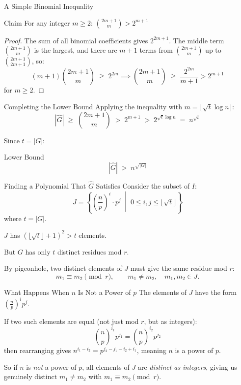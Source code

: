 \documentclass{beamer}
\begin{document}

\begin{frame}{A Simple Binomial Inequality}
\begin{block}{Claim}
For any integer $m \ge 2$: $\displaystyle\binom{2m+1}{m} > 2^{m+1}$
\end{block}

\begin{proof}
The sum of all binomial coefficients gives $2^{2m+1}$. The middle
term $\binom{2m+1}{m}$ is the largest, and there are $m+1$ terms
from $\binom{2m+1}{m}$ up to $\binom{2m+1}{2m+1}$, so:
\[
    (m+1)\binom{2m+1}{m} \;\ge\; 2^{2m} \implies \binom{2m+1}{m} \;\ge\; \frac{2^{2m}}{m+1} > 2^{m+1}
\]
for $m \ge 2$.
\end{proof}
\end{frame}


\begin{frame}{Completing the Lower Bound}
Applying the inequality with $m = \lfloor\sqrt{t}\log n\rfloor$:
\[
    |\hat{G}| \;\ge\; \binom{2m+1}{m} \;>\; 2^{m+1} \;>\; 2^{\sqrt{t}\log n} \;=\; n^{\sqrt{t}}
\]

Since $t = |G|$:

\begin{block}{Lower Bound}
\[
    |\hat{G}| \;>\; n^{\sqrt{|G|}}
\]
\end{block}
\end{frame}

\begin{frame}{Finding a Polynomial That $\hat{G}$ Satisfies}
Consider the subset of $I$:
\[
    J = \left\{ \left(\frac{n}{p}\right)^i \cdot p^j \;\middle|\; 0 \le i, j \le \lfloor\sqrt{t}\rfloor \right\}
\]
where $t = |G|$.

$J$ has $(\lfloor\sqrt{t}\rfloor + 1)^2 > t$ elements.

But $G$ has only $t$ distinct residues mod $r$.

By pigeonhole, two distinct elements of $J$ must give the
same residue mod $r$:
\[
    m_1 \equiv m_2 \pmod{r}, \qquad m_1 \ne m_2, \quad m_1, m_2 \in J.
\]
\end{frame}


\begin{frame}{What Happens When $n$ Is Not a Power of $p$}
The elements of $J$ have the form $\left(\frac{n}{p}\right)^i p^j$.

If two such elements are equal (not just mod $r$, but as integers):
\[
    \left(\frac{n}{p}\right)^{i_1} p^{j_1} = \left(\frac{n}{p}\right)^{i_2} p^{j_2}
\]
then rearranging gives $n^{i_1 - i_2} = p^{j_2 - j_1 - i_2 + i_1}$,
meaning $n$ is a power of $p$.

So if $n$ is \emph{not} a power of $p$, all elements of $J$ are
\emph{distinct as integers}, giving us genuinely distinct $m_1 \ne m_2$
with $m_1 \equiv m_2 \pmod{r}$.
\end{frame}
\end{document}
